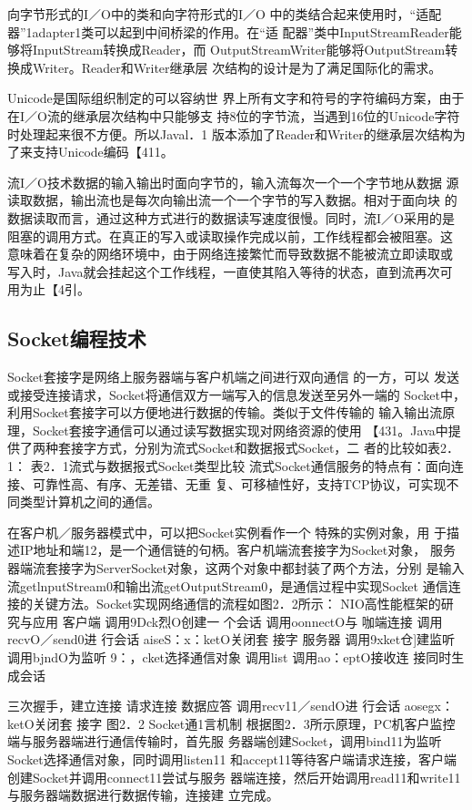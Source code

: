 向字节形式的I／O中的类和向字符形式的I／O
中的类结合起来使用时，“适配器”1adapter1类可以起到中间桥梁的作用。在“适
配器”类中InputStreamReader能够将InputStream转换成Reader，而
OutputStreamWriter能够将OutputStream转换成Writer。Reader和Writer继承层
次结构的设计是为了满足国际化的需求。

Unicode是国际组织制定的可以容纳世
界上所有文字和符号的字符编码方案，由于在I／O流的继承层次结构中只能够支
持8位的字节流，当遇到16位的Unicode字符时处理起来很不方便。所以Javal．1
版本添加了Reader和Writer的继承层次结构为了来支持Unicode编码【411。

流I／O技术数据的输入输出时面向字节的，输入流每次一个一个字节地从数据
源读取数据，输出流也是每次向输出流一个一个字节的写入数据。相对于面向块
的数据读取而言，通过这种方式进行的数据读写速度很慢。同时，流I／O采用的是
阻塞的调用方式。在真正的写入或读取操作完成以前，工作线程都会被阻塞。这
意味着在复杂的网络环境中，由于网络连接繁忙而导致数据不能被流立即读取或
写入时，Java就会挂起这个工作线程，一直使其陷入等待的状态，直到流再次可
用为止【4引。
\subsection{Socket编程技术}
Socket套接字是网络上服务器端与客户机端之间进行双向通信
的一方，可以
发送或接受连接请求，Socket将通信双方一端写入的信息发送至另外一端的
Socket中，利用Socket套接字可以方便地进行数据的传输。类似于文件传输的
输入输出流原理，Socket套接字通信可以通过读写数据实现对网络资源的使用
【431。Java中提供了两种套接字方式，分别为流式Socket和数据报式Socket，二
者的比较如表2．1：
表2．1流式与数据报式Socket类型比较
流式Socket通信服务的特点有：面向连接、可靠性高、有序、无差错、无重
复、可移植性好，支持TCP协议，可实现不同类型计算机之间的通信。

在客户机／服务器模式中，可以把Socket实例看作一个
特殊的实例对象，用
于描述IP地址和端12，是一个通信链的句柄。客户机端流套接字为Socket对象，
服务器端流套接字为ServerSocket对象，这两个对象中都封装了两个方法，分别
是输入流getlnputStream0和输出流getOutputStream0，是通信过程中实现Socket
通信连接的关键方法。Socket实现网络通信的流程如图2．2所示：
NIO高性能框架的研究与应用
客户端
调用9Dck烈O创建一
个会话
调用oonnectO与
咖端连接
调用recvO／send0进
行会话
aiseS：x：ketO关闭套
接字
服务器
调用9xket仓]建监听
调用bjndO为监听
9：，cket选择通信对象
调用list
调用ao：eptO接收连
接同时生成会话


三次握手，建立连接
请求连接
数据应答
调用recv11／sendO进
行会话
aosegx：ketO关闭套
接字
图2．2 Socket通1言机制
根据图2．3所示原理，PC机客户监控端与服务器端进行通信传输时，首先服
务器端创建Socket，调用bind11为监听Socket选择通信对象，同时调用listen11
和accept11等待客户端请求连接，客户端创建Socket并调用connect11尝试与服务
器端连接，然后开始调用read11和write11与服务器端数据进行数据传输，连接建
立完成。

